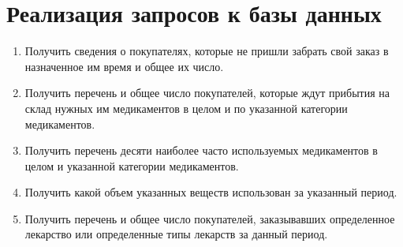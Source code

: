 \documentclass[a4paper]{article}
\begin{document}
	\section{Реализация запросов к базы данных}
		\begin{enumerate}			
			\item Получить сведения о покупателях, которые не пришли забрать свой заказ в назначенное им время и общее их число.
				
				
				
				

			\item Получить перечень и общее число покупателей, которые ждут прибытия на склад нужных им медикаментов в целом и по указанной категории медикаментов.
			
				
			
				
			
				
			
				
			
			\item Получить перечень десяти наиболее часто используемых медикаментов в целом и указанной категории медикаментов.
			
			\item  Получить какой объем указанных веществ использован за указанный период.
			
			\item Получить перечень и общее число покупателей, заказывавших определенное лекарство или определенные типы лекарств за данный период.
			

\end{enumerate}
\end{document}
